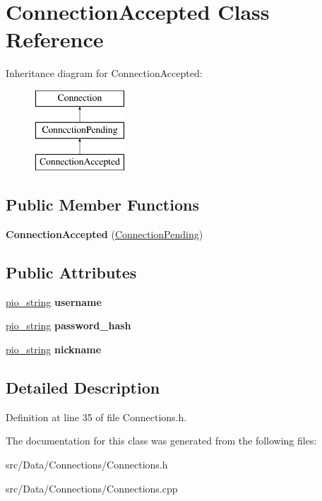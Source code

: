 \hypertarget{class_connection_accepted}{
\section{ConnectionAccepted Class Reference}
\label{class_connection_accepted}
}
Inheritance diagram for ConnectionAccepted:\begin{figure}[H]
\begin{center}
\leavevmode
\includegraphics[height=3.000000cm]{class_connection_accepted}
\end{center}
\end{figure}
\subsection*{Public Member Functions}
\begin{DoxyCompactItemize}
\item 
\hypertarget{class_connection_accepted_a22875371e2e18fe61be2715f9e7d3486}{
{\bfseries ConnectionAccepted} (\hyperlink{class_connection_pending}{ConnectionPending})}
\label{class_connection_accepted_a22875371e2e18fe61be2715f9e7d3486}

\end{DoxyCompactItemize}
\subsection*{Public Attributes}
\begin{DoxyCompactItemize}
\item 
\hypertarget{class_connection_accepted_a6783113fd99060908a34e2ce16c98a10}{
\hyperlink{classpio__string}{pio\_\-string} {\bfseries username}}
\label{class_connection_accepted_a6783113fd99060908a34e2ce16c98a10}

\item 
\hypertarget{class_connection_accepted_ad14a4356345a2139310ee66e02a8b4c1}{
\hyperlink{classpio__string}{pio\_\-string} {\bfseries password\_\-hash}}
\label{class_connection_accepted_ad14a4356345a2139310ee66e02a8b4c1}

\item 
\hypertarget{class_connection_accepted_a276903639155c2d63adba4a69a7cde54}{
\hyperlink{classpio__string}{pio\_\-string} {\bfseries nickname}}
\label{class_connection_accepted_a276903639155c2d63adba4a69a7cde54}

\end{DoxyCompactItemize}


\subsection{Detailed Description}


Definition at line 35 of file Connections.h.



The documentation for this class was generated from the following files:\begin{DoxyCompactItemize}
\item 
src/Data/Connections/Connections.h\item 
src/Data/Connections/Connections.cpp\end{DoxyCompactItemize}
